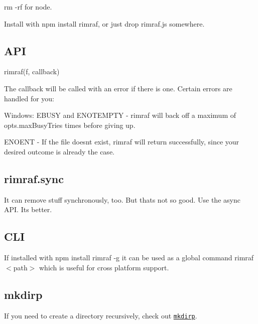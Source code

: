 {\ttfamily rm -\/rf} for node.

Install with {\ttfamily npm install rimraf}, or just drop rimraf.\+js somewhere.

\subsection*{A\+PI}

{\ttfamily rimraf(f, callback)}

The callback will be called with an error if there is one. Certain errors are handled for you\+:


\begin{DoxyItemize}
\item Windows\+: {\ttfamily E\+B\+U\+SY} and {\ttfamily E\+N\+O\+T\+E\+M\+P\+TY} -\/ rimraf will back off a maximum of {\ttfamily opts.\+max\+Busy\+Tries} times before giving up.
\item {\ttfamily E\+N\+O\+E\+NT} -\/ If the file doesn\textquotesingle{}t exist, rimraf will return successfully, since your desired outcome is already the case.
\end{DoxyItemize}

\subsection*{rimraf.\+sync}

It can remove stuff synchronously, too. But that\textquotesingle{}s not so good. Use the async A\+PI. It\textquotesingle{}s better.

\subsection*{C\+LI}

If installed with {\ttfamily npm install rimraf -\/g} it can be used as a global command {\ttfamily rimraf $<$path$>$} which is useful for cross platform support.

\subsection*{mkdirp}

If you need to create a directory recursively, check out \href{https://github.com/substack/node-mkdirp}{\tt mkdirp}. 